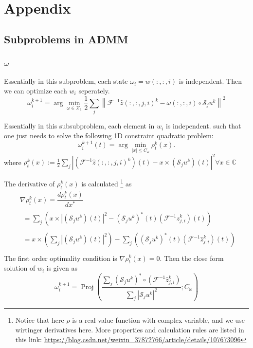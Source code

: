 \documentclass{article}
\numberwithin{equation}{section}
\begin{document}
  \section{Appendix}
\subsection{Subproblems in ADMM}
\label{section:subproblems}
\subsubsection{$\omega$}
Essentially in this subproblem, each state $\omega_i=w(:,:,i)$ is independent. Then we can optimize each $w_i$ seperately.
 $$
 \omega_i^{k+1}=\arg \min _{\omega \in \mathcal{X}_{1}} \frac{1}{2} \sum_{j}\left\|\mathcal{F}^{-1} \hat{z}(:,:,j,i)^{k}-\omega(:,:,i) \circ \mathcal{S}_{j} u^{k}\right\|^{2}
 $$
 
 Essentially in this subsubproblem, each element in $w_i$ is independent.
 such that one just needs to solve the following 1D constraint quadratic problem:
$$
\omega_i^{k+1}(t)=\arg \min _{|x| \leq C_{\omega}} \rho_{t}^{k}(x).
$$
where
$\rho_{t}^{k}(x):=\frac{1}{2} \sum_{j}\left|\left(\mathcal{F}^{-1} \hat{z}(:,:,j,i)^{k}\right)(t)-x \times\left(\mathcal{S}_{j} u^{k}\right)(t)\right|^{2} \forall x \in \mathbb{C}$ 

The derivative of $\rho_{t}^{k}(x)$ is calculated 
\footnote{Notice that here $\rho$ is a real value function with complex variable, and we use wirtinger derivatives here. More properties and calculation rules are listed in this link: \url{https://blog.csdn.net/weixin_37872766/article/details/107673096}} as
$$
\begin{aligned}
&\nabla \rho_{t}^{k}(x) = \dfrac{ d\rho_{t}^{k}(x)}{dx^*} \\
&\begin{aligned}
=\sum_{j}\left(x \times\left|\left(\mathcal{S}_{j} u^{k}\right)(t)\right|^{2}-\left(\mathcal{S}_{j} u^{k}\right)^{*}(t)\left(\mathcal{F}^{-1} \hat{z}_{j,i}^{k}\right)(t)\right)
\end{aligned} \\
&\begin{aligned}
=x \times\left(\sum_{j}\left|\left(\mathcal{S}_{j} u^{k}\right)(t)\right|^{2}\right)-\sum_{j}\left(\left(\mathcal{S}_{j} u^{k}\right)^{*}(t)\left(\mathcal{F}^{-1} \hat{z}_{j,i}^{k}\right)(t)\right) \\
\end{aligned}
\end{aligned}
$$
The first order optimality condition is $\nabla \rho_{t}^{k}(x)=0 $. Then the close form solution of $w_i$ is given as
$$
\omega_i^{k+1}=\operatorname{Proj}\left(\frac{ \sum_{j}\left(\mathcal{S}_{j} u^{k}\right)^{*} \circ\left(\mathcal{F}^{-1} \hat{z}_{j,i}^{k}\right)}{ \sum_{j}\left|\mathcal{S}_{j} u^{k}\right|^{2}} ; C_{\omega}\right)
$$
\end{document}
